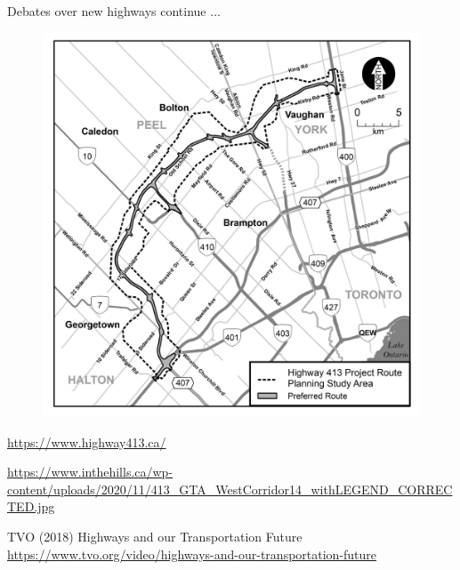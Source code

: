 \documentclass[aspectratio=169]{beamer}
\begin{document}
\begin{frame}
	
	Debates over new highways continue ...
	
	\begin{figure}
		\centering
		\includegraphics[width=0.45\linewidth]{images/highway413.jpg}
		
	\end{figure}
	\tiny{\url{https://www.highway413.ca/}}
	
	\vspace{1mm}
	
	 \url{https://www.inthehills.ca/wp-content/uploads/2020/11/413_GTA_WestCorridor14_withLEGEND_CORRECTED.jpg}
	\vspace{1mm}
	
	\tiny{TVO (2018) Highways and our Transportation Future \url{https://www.tvo.org/video/highways-and-our-transportation-future}} 
	
\end{frame}
	
	
\end{document}
